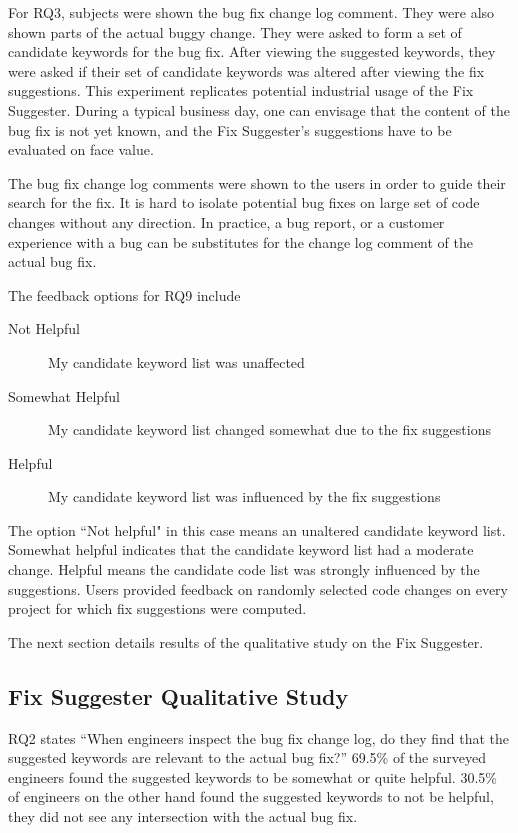 \documentclass[10pt, conference, letterpaper, compsocconf]{IEEEtran}
\begin{document}
For RQ3, subjects were shown the bug fix change log comment. They were also shown parts of the actual buggy change. They were asked to form a set of candidate keywords for the bug fix. After viewing the suggested keywords, they were asked if their set of candidate keywords was altered after viewing the fix suggestions. This experiment replicates potential industrial usage of the Fix Suggester. During a typical business day, one can envisage that the content of the bug fix is not yet known, and the Fix Suggester's suggestions have to be evaluated on face value. 

The bug fix change log comments were shown to the users in order to guide their search for the fix. It is hard to isolate potential bug fixes on large set of code changes without any direction. In practice, a bug report, or a customer experience with a bug can be substitutes for the change log comment of the actual bug fix.

The feedback options for RQ9 include

\begin{description}
	\item[Not Helpful] My candidate keyword list was unaffected
	\item[Somewhat Helpful] My candidate keyword list changed somewhat due to the fix suggestions
	\item[Helpful] My candidate keyword list was influenced by the fix suggestions
\end{description}

The option ``Not helpful" in this case means an unaltered candidate keyword list. Somewhat helpful indicates that the candidate keyword list had a moderate change. Helpful means the candidate code list was strongly influenced by the suggestions. Users provided feedback on randomly selected code changes on every project for which fix suggestions were computed.

The next section details results of the qualitative study on the Fix Suggester.

\subsection{Fix Suggester Qualitative Study}
\label{FixSuggesterUserStudy}

RQ2 states ``When engineers inspect the bug fix change log, do they find that the suggested keywords are relevant to the actual bug fix?'' 69.5\% of the surveyed engineers found the suggested keywords to be somewhat or quite helpful. 30.5\% of engineers on the other hand found the suggested keywords to not be helpful, they did not see any intersection with the actual bug fix.
\end{document}

